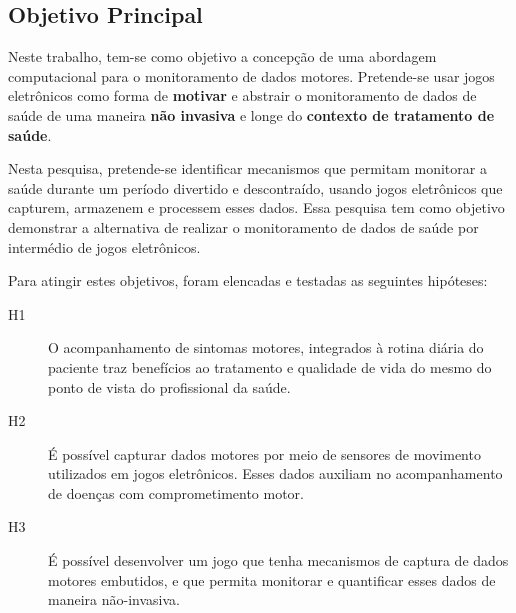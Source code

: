\subsection{Objetivo Principal}
Neste trabalho, tem-se como objetivo a concepção de uma abordagem computacional para o monitoramento de dados motores. Pretende-se usar jogos eletrônicos como forma de \textbf{motivar} e abstrair o monitoramento de dados de saúde de uma maneira \textbf{não invasiva} e longe do \textbf{contexto de tratamento de saúde}.


Nesta pesquisa, pretende-se identificar mecanismos que permitam monitorar a saúde durante um período divertido e descontraído, usando jogos eletrônicos que capturem, armazenem  e processem esses dados. Essa pesquisa tem como objetivo demonstrar a alternativa de realizar o monitoramento de dados de saúde por intermédio de jogos eletrônicos.

Para atingir estes objetivos, foram elencadas e testadas as seguintes hipóteses:
	\begin{description}
	\item[H1] O acompanhamento de sintomas motores, integrados à rotina diária do paciente traz benefícios ao tratamento e qualidade de vida do mesmo do ponto de vista do profissional da saúde.
	\item[H2] É possível capturar dados motores por meio de sensores de movimento utilizados em jogos eletrônicos. Esses dados auxiliam no acompanhamento de doenças com comprometimento motor.
	\item[H3] É possível desenvolver um jogo que tenha mecanismos de captura de dados motores embutidos, e que permita monitorar e quantificar esses dados de maneira não-invasiva.
	\end{description}
	
